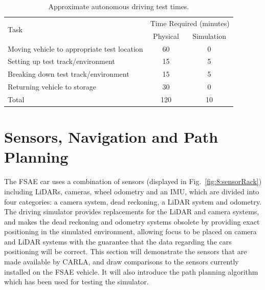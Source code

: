 \begin{table}[H]
	\caption{Approximate autonomous driving test times.}
	\centering
	\label{tbl:8:simTimeSavings}
	\begin{tabularx}{0.8\linewidth}{Xcc}
		\toprule
		\multirow{2}{*}{Task}                       & \multicolumn{2}{c}{Time Required (minutes)} \\
		\cmidrule{2-3}                          & Physical &            Simulation            \\ \midrule
		Moving vehicle to appropriate test location &    60    &                0                 \\
		Setting up test track/environment           &    15    &                5                 \\
		Breaking down test track/environment        &    15    &                5                 \\
		Returning vehicle to storage                &    30    &                0                 \\ \midrule
		Total                                       &   120    &                10                \\ \bottomrule
	\end{tabularx}
\end{table}

\section{Sensors, Navigation and Path Planning} \label{sec:8:navigationAndPathPlanning}

The FSAE car uses a combination of sensors (displayed in Fig.~\ref{fig:8:sensorRack}) including LiDARs, cameras, wheel odometry and an IMU, which are divided into four categories: a camera system, dead reckoning, a LiDAR system and odometry.
The driving simulator provides replacements for the LiDAR and camera systems, and makes the dead reckoning and odometry systems obsolete by providing exact positioning in the simulated environment, allowing focus to be placed on camera and LiDAR systems with the guarantee that the data regarding the cars positioning will be correct.
This section will demonstrate the sensors that are made available by CARLA, and draw comparisons to the sensors currently installed on the FSAE vehicle.
It will also introduce the path planning algorithm which has been used for testing the simulator.

